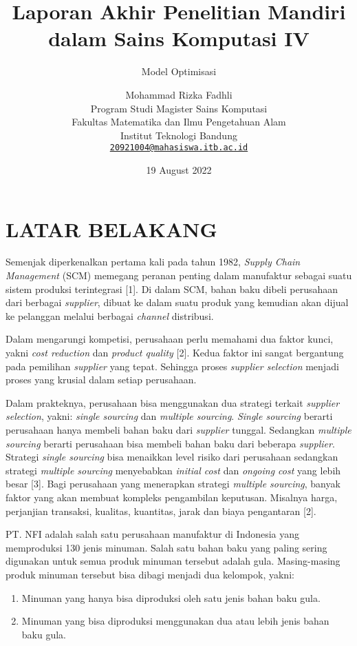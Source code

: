 \documentclass[
  12pt,
]{article}
\title{Laporan Akhir Penelitian Mandiri dalam Sains Komputasi IV}
\subtitle{Model Optimisasi}
\author{Mohammad Rizka Fadhli\\
Program Studi Magister Sains Komputasi\\
Fakultas Matematika dan Ilmu Pengetahuan Alam\\
Institut Teknologi Bandung\\
\href{mailto:20921004@mahasiswa.itb.ac.id}{\nolinkurl{20921004@mahasiswa.itb.ac.id}}}
\date{19 August 2022}
\providecommand{\tightlist}{%
  \setlength{\itemsep}{0pt}\setlength{\parskip}{0pt}}
\begin{document}
\maketitle

\newpage
\tableofcontents
\newpage
\listoffigures
\newpage
\listoftables

\newpage

\hypertarget{latar-belakang}{%
\section{LATAR BELAKANG}\label{latar-belakang}}

Semenjak diperkenalkan pertama kali pada tahun 1982, \emph{Supply Chain
Management} (SCM) memegang peranan penting dalam manufaktur sebagai
suatu sistem produksi terintegrasi {[}1{]}. Di dalam SCM, bahan baku
dibeli perusahaan dari berbagai \emph{supplier}, dibuat ke dalam suatu
produk yang kemudian akan dijual ke pelanggan melalui berbagai
\emph{channel} distribusi.

Dalam mengarungi kompetisi, perusahaan perlu memahami dua faktor kunci,
yakni \emph{cost reduction} dan \emph{product quality} {[}2{]}. Kedua
faktor ini sangat bergantung pada pemilihan \emph{supplier} yang tepat.
Sehingga proses \emph{supplier selection} menjadi proses yang krusial
dalam setiap perusahaan.

Dalam prakteknya, perusahaan bisa menggunakan dua strategi terkait
\emph{supplier selection}, yakni: \emph{single sourcing} dan
\emph{multiple sourcing}. \emph{Single sourcing} berarti perusahaan
hanya membeli bahan baku dari \emph{supplier} tunggal. Sedangkan
\emph{multiple sourcing} berarti perusahaan bisa membeli bahan baku dari
beberapa \emph{supplier}. Strategi \emph{single sourcing} bisa menaikkan
level risiko dari perusahaan sedangkan strategi \emph{multiple sourcing}
menyebabkan \emph{initial cost} dan \emph{ongoing cost} yang lebih besar
{[}3{]}. Bagi perusahaan yang menerapkan strategi \emph{multiple
sourcing}, banyak faktor yang akan membuat kompleks pengambilan
keputusan. Misalnya harga, perjanjian transaksi, kualitas, kuantitas,
jarak dan biaya pengantaran {[}2{]}.

PT. NFI adalah salah satu perusahaan manufaktur di Indonesia yang
memproduksi 130 jenis minuman. Salah satu bahan baku yang paling sering
digunakan untuk semua produk minuman tersebut adalah gula. Masing-masing
produk minuman tersebut bisa dibagi menjadi dua kelompok, yakni:

\begin{enumerate}
\def\labelenumi{\arabic{enumi}.}
\tightlist
\item
  Minuman yang hanya bisa diproduksi oleh satu jenis bahan baku gula.
\item
  Minuman yang bisa diproduksi menggunakan dua atau lebih jenis bahan
  baku gula.
\end{enumerate}
\end{document}
